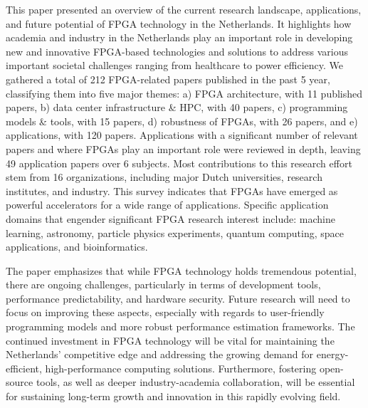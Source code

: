 


This paper presented an overview of the current research landscape, applications, and future potential of FPGA technology in the Netherlands. It highlights how academia and industry in the Netherlands play an important role in developing new and innovative FPGA-based technologies and solutions to address various important societal challenges ranging from healthcare to power efficiency. We gathered a total of %
212 FPGA-related papers published in the past 5 year, classifying %
them into five major themes: a) FPGA architecture, with 11 published papers, b) data center infrastructure \& HPC, with 40 papers, c) programming models \& tools, with 15 papers, d) robustness of FPGAs, with 26 papers, and e) applications, with 120 papers. Applications with a significant number of relevant papers and where FPGAs play an important role were reviewed in depth, leaving 49 application papers over 6 subjects. Most contributions to this research effort stem from 16 organizations, including major Dutch universities, research institutes, and %
industry. 
This survey indicates that FPGAs have emerged as powerful accelerators for a wide range of applications. Specific application domains that engender significant FPGA research interest include: machine learning, astronomy, particle physics experiments, quantum computing, space applications,
and bioinformatics. 

The paper emphasizes that while FPGA technology holds tremendous potential, there are ongoing challenges, particularly in terms of development tools, performance predictability, and hardware security. Future research will need to focus on improving these aspects, especially with regards to user-friendly programming models and more robust performance estimation frameworks. The continued investment in FPGA technology will be vital for maintaining the Netherlands' competitive edge and addressing the growing demand for energy-efficient, high-performance computing solutions. Furthermore, fostering open-source tools, as well as deeper industry-academia collaboration, will be essential for sustaining long-term growth and innovation in this rapidly evolving field.